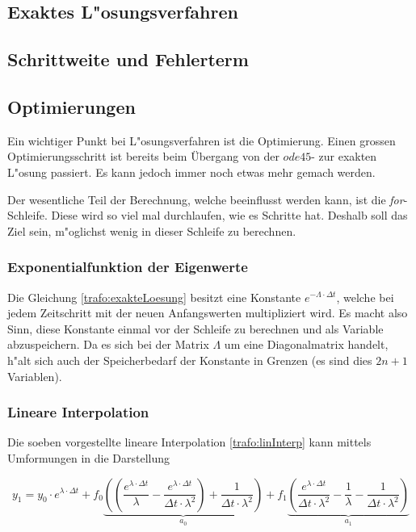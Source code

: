 \begin{refsection}
\subsection{Exaktes L"osungsverfahren}

\subsection{Schrittweite und Fehlerterm}

\subsection{Optimierungen}

Ein wichtiger Punkt bei L"osungsverfahren ist die Optimierung. Einen grossen Optimierungsschritt ist bereits beim Übergang von der $ode45$- zur exakten L"osung passiert. Es kann jedoch immer noch etwas mehr gemach werden. 

Der wesentliche Teil der Berechnung, welche beeinflusst werden kann, ist die \textit{for}-Schleife. Diese wird so viel mal durchlaufen, wie es Schritte hat. Deshalb soll das Ziel sein, m"oglichst wenig in dieser Schleife zu berechnen. 

\subsubsection{Exponentialfunktion der Eigenwerte}
Die Gleichung \ref{trafo:exakteLoesung} besitzt eine Konstante $e^{-\Lambda \cdot \Delta t}$, welche bei jedem Zeitschritt mit der neuen Anfangswerten multipliziert wird. Es macht also Sinn, diese Konstante einmal vor der Schleife zu berechnen und als Variable abzuspeichern. Da es sich bei der Matrix $\Lambda$ um eine Diagonalmatrix handelt, h"alt sich auch der Speicherbedarf der Konstante in Grenzen (es sind dies $2n + 1$ Variablen). 

\subsubsection{Lineare Interpolation}
Die soeben vorgestellte lineare Interpolation \ref{trafo:linInterp} kann mittels Umformungen in die Darstellung 

\begin{equation*}
	y_1 = y_0 \cdot e^{\lambda \cdot \Delta t} + f_0 \underbrace{\left(\left(\frac{e^{\lambda \cdot \Delta t}}{\lambda} - \frac{e^{\lambda \cdot \Delta t}}{\Delta t \cdot \lambda ^2}\right) + \frac{1}{\Delta t \cdot \lambda^2}\right)}_{a_0} + f_1 \underbrace{\left(\frac{e^{\lambda \cdot \Delta t}}{\Delta t \cdot \lambda^2} - \frac{1}{\lambda} - \frac{1}{\Delta t \cdot \lambda^2}\right)}_{a_1}
\end{equation*} 


\end{refsection}
